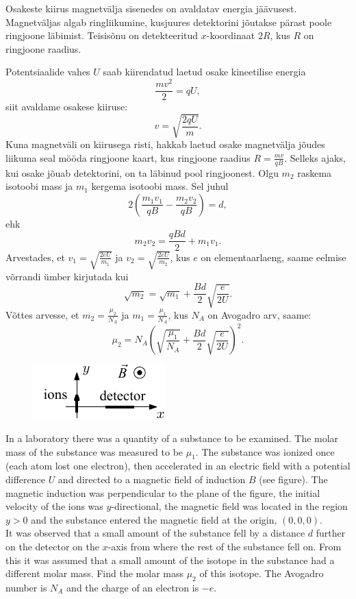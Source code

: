 \hint
Osakeste kiirus magnetvälja sisenedes on avaldatav energia jäävusest. Magnetväljas algab ringliikumine, kusjuures detektorini jõutakse pärast poole ringjoone läbimist. Teisisõnu on detekteeritud $x$-koordinaat $2R$, kus $R$ on ringjoone raadius.

\solu
Potentsiaalide vahes $U$ saab kiirendatud laetud osake kineetilise
energia
\[
\frac{mv^{2}}{2}=qU,
\]
siit avaldame osakese kiiruse:
\[
v=\sqrt{\frac{2qU}{m}}.
\]
Kuna magnetväli on kiirusega risti, hakkab laetud osake 
magnetvälja jõudes liikuma seal mööda ringjoone kaart, kus ringjoone raadius
$R=\frac{mv}{qB}$. Selleks ajaks, kui osake jõuab detektorini,
on ta läbinud pool ringjoonest. Olgu $m_{2}$ raskema isotoobi
mass ja $m_{1}$ kergema isotoobi mass. Sel juhul 
\[ 
2\left(\frac{m_{1}v_{1}}{qB}-\frac{m_{2}v_{2}}{qB}\right)=d, 
\]
ehk
\[ 
m_{2}v_{2}=\frac{qBd}{2}+m_{1}v_{1 }.
\]
Arvestades, et $v_{1}=\sqrt{\frac{2eU}{m_{1}}}$ ja $v_{2}=\sqrt{\frac{2eU}{m_{2}}}$,
kus $e$ on elementaarlaeng, saame eelmise võrrandi ümber kirjutada kui
\[ \sqrt{m_{2}}=\sqrt{m_{1}}+\frac{Bd}{2}\sqrt{\frac{e}{2U}}. \]
Võttes arvesse, et $m_{2}=\frac{\mu_{2}}{N_{A}}$ ja $m_{1}=\frac{\mu_{1}}{N_{A}}$,
kus $N_{A}$ on Avogadro arv, saame:
\[ \mu_{2}=N_{A}\left(\sqrt{\frac{\mu_{1}}{N_{A}}}+\frac{Bd}{2}\sqrt{\frac{e}{2U}}\right)^{2}.\]

\begin{figure}%
\includegraphics[width=\linewidth]{2013-v2g-10-massspektromeeter_ipe_ing}%
\end{figure}
In a laboratory there was a quantity of a substance to be examined. The molar mass of the substance was measured to be $\mu_{1}$. The substance was ionized once (each atom lost one electron), then accelerated in an electric field with a potential difference $U$ and directed to a magnetic field of induction $B$ (see figure). The magnetic induction was perpendicular to the plane of the figure, the initial velocity of the ions was $y$-directional, the magnetic field was located in the region $y>0$ and the substance entered the magnetic field at the origin, $(0, 0, 0)$.\\
It was observed that a small amount of the substance fell by a distance $d$ further on the detector on the $x$-axis from where the rest of the substance fell on. From this it was assumed that a small amount of the isotope in the substance had a different molar mass. Find the molar mass $\mu_{2}$ of this isotope. The Avogadro number is $N_A$ and the charge of an electron is $-e$.

